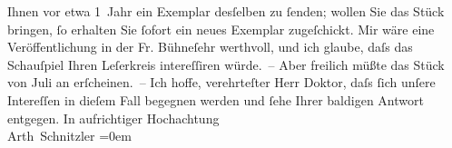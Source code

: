 \begin{ledgroupsized}[t]{13cm}
               Ihnen vor etwa {\pb}1 Jahr ein Exemplar desſelben zu ſenden;
               wollen Sie das Stück bringen,
               ſo erhalten Sie ſofort ein neues Exemplar zugeſchickt.\pend
           \pstart
           Mir wäre eine Veröffentlichung in der Fr. Bühneſehr werthvoll, und ich glaube, daſs das Schauſpiel
               Ihren Leſerkreis intereſſiren {\pb}würde. – Aber freilich müßte
               das Stück von Juli an erſcheinen. –\pend
           \pstart
           Ich hoffe, verehrteſter Herr Doktor, daſs ſich unſere Intereſſen in dieſem Fall
               begegnen werden und ſehe Ihrer baldigen Antwort entgegen.\pend
           \pstart
           In aufrichtiger Hochachtung{\\[\baselineskip]}\spacefill\mbox{Arth Schnitzler}\pend
           \leftskip=0em{}
         
         \endnumbering{}\end{ledgroupsized}  \newcommand{\dateiname}{L00222}\newcommand{\titel}{Arthur Schnitzler an Wilhelm Bölsche, 14. 6. 1893}\newcommand{\editorInnen}{Martin Anton Müller und Gerd-Hermann Susen}
      